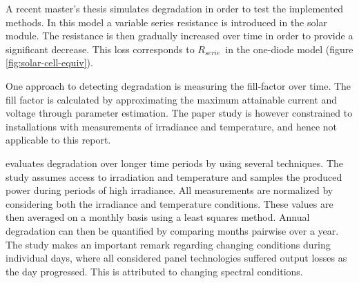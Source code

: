 A recent master's thesis\cite{Zhao2010thesis} simulates degradation in order to test the implemented methods.
In this model a variable series resistance is introduced in the solar module.
The resistance is then gradually increased over time in order to provide a significant decrease.
This loss corresponds to $R_{serie}$ in the one-diode model (figure \ref{fig:solar-cell-equiv}).

One approach to detecting degradation is measuring the fill-factor over time\cite{Raina2013}.
The fill factor is calculated by approximating the maximum attainable current and voltage through parameter estimation.
The paper study is however constrained to installations with measurements of irradiance and temperature, and hence not applicable to this report.

\cite{Makrides2010} evaluates degradation over longer time periods by using several techniques.
The study assumes access to irradiation and temperature and samples the produced power during periods of high irradiance.
All measurements are normalized by considering both the irradiance and temperature conditions.
These values are then averaged on a monthly basis using a least squares method.
Annual degradation can then be quantified by comparing months pairwise over a year.
The study makes an important remark regarding changing conditions during individual days, where all considered panel technologies suffered output losses as the day progressed.
This is attributed to changing spectral conditions.









